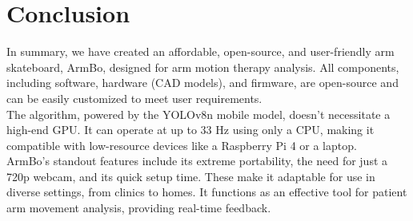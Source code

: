 \documentclass[12pt, twoside]{report}
\begin{document}
\chapter{Conclusion}
In summary, we have created an affordable, open-source, and user-friendly arm skateboard, ArmBo, designed for arm motion therapy analysis. All components, including software, hardware (CAD models), and firmware, 
are open-source and can be easily customized to meet user requirements. \\


The algorithm, powered by the YOLOv8n mobile model, 
doesn’t necessitate a high-end GPU. It can operate at up to 33 Hz 
using only a CPU, making it compatible with low-resource devices like 
a Raspberry Pi 4 or a laptop. \\

ArmBo’s standout features include its extreme portability, 
the need for just a 720p webcam, and its quick setup time. 
These make it adaptable for use in diverse settings, from clinics to homes. 
It functions as an effective tool for patient arm movement analysis, 
providing real-time feedback. \\
\end{document}
